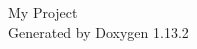 \documentclass[twoside]{book}
\newcommand{\+}{\discretionary{\mbox{\scriptsize$\hookleftarrow$}}{}{}}
\newcommand{\clearemptydoublepage}{%
    \newpage{\pagestyle{empty}\cleardoublepage}%
  }
\begin{document}
\raggedbottom
\begin{titlepage}
	\vspace*{7cm}
	\begin{center}%
		{\Large My Project}\\
		\vspace*{1cm}
		{\large Generated by Doxygen 1.13.2}\\
	\end{center}
\end{titlepage}
\clearemptydoublepage
{}
\tableofcontents
\clearemptydoublepage
{}
\backmatter
\newpage
{}
\clearemptydoublepage
{}
\printindex
\end{document}
